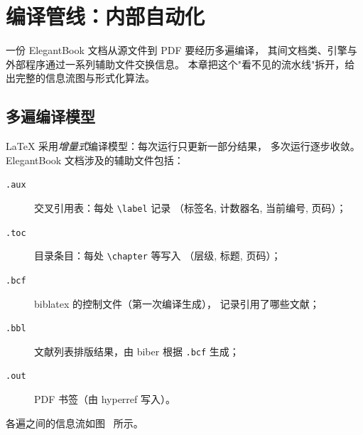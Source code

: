 
\chapter{编译管线：内部自动化}

一份 ElegantBook 文档从源文件到 PDF 要经历多遍编译，
其间文档类、引擎与外部程序通过一系列辅助文件交换信息。
本章把这个"看不见的流水线"拆开，给出完整的信息流图与形式化算法。

\section{多遍编译模型}

LaTeX 采用\emph{增量式}编译模型：每次运行只更新一部分结果，
多次运行逐步收敛。ElegantBook 文档涉及的辅助文件包括：

\begin{description}
  \item[\texttt{.aux}] 交叉引用表：每处 \verb|\label| 记录
        （标签名, 计数器名, 当前编号, 页码）；
  \item[\texttt{.toc}] 目录条目：每处 \verb|\chapter| 等写入
        （层级, 标题, 页码）；
  \item[\texttt{.bcf}] biblatex 的控制文件（第一次编译生成），
        记录引用了哪些文献；
  \item[\texttt{.bbl}] 文献列表排版结果，由 biber 根据
        \texttt{.bcf} 生成；
  \item[\texttt{.out}] PDF 书签（由 hyperref 写入）。
\end{description}

各遍之间的信息流如图~ 所示。

